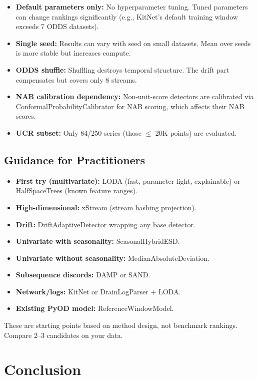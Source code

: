 \documentclass[11pt,a4paper]{article}
\begin{document}
\begin{itemize}
    \item \textbf{Default parameters only:} No hyperparameter tuning. Tuned parameters can change rankings significantly (e.g., KitNet's default training window exceeds 7 ODDS datasets).
    \item \textbf{Single seed:} Results can vary with seed on small datasets. Mean over seeds is more stable but increases compute.
    \item \textbf{ODDS shuffle:} Shuffling destroys temporal structure. The drift part compensates but covers only 8 streams.
    \item   \textbf{NAB calibration dependency:} Non-unit-score detectors are calibrated via ConformalProbabilityCalibrator for NAB scoring, which affects their NAB scores.
    \item \textbf{UCR subset:} Only 84/250 series (those $\le$ 20K points) are evaluated.
\end{itemize}

\subsection{Guidance for Practitioners}
\label{sec:guidance}

\begin{itemize}
    \item \textbf{First try (multivariate):} LODA (fast, parameter-light, explainable) or HalfSpaceTrees (known feature ranges).
    \item \textbf{High-dimensional:} xStream (stream hashing projection).
    \item \textbf{Drift:} DriftAdaptiveDetector wrapping any base detector.
    \item \textbf{Univariate with seasonality:} SeasonalHybridESD.
    \item \textbf{Univariate without seasonality:} MedianAbsoluteDeviation.
    \item \textbf{Subsequence discords:} DAMP or SAND.
    \item \textbf{Network/logs:} KitNet or DrainLogParser + LODA.
    \item \textbf{Existing PyOD model:} ReferenceWindowModel.
\end{itemize}

These are starting points based on method design, not benchmark rankings. Compare 2--3 candidates on your data.

\section{Conclusion}
\label{sec:conclusion}
\end{document}
